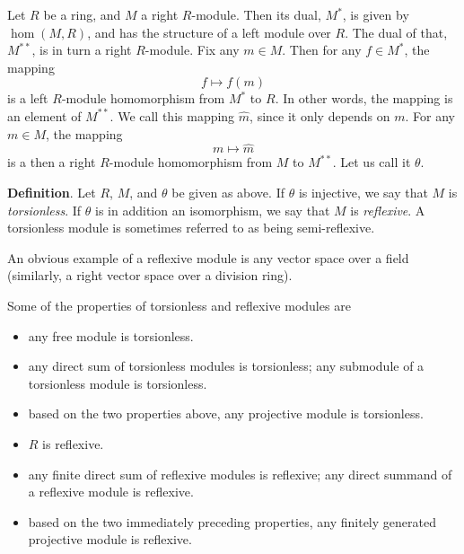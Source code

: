 \documentclass[12pt]{article}
\begin{document}
Let $R$ be a ring, and $M$ a right $R$-module.  Then its dual, $M^*$, is given by $\hom(M,R)$, and has the structure of a left module over $R$.  The dual of that, $M^{**}$, is in turn a right $R$-module.  Fix any $m\in M$.  Then for any $f\in M^*$, the mapping $$f \mapsto f(m)$$ is a left $R$-module homomorphism from $M^*$ to $R$.  In other words, the mapping is an element of $M^{**}$.  We call this mapping $\hat{m}$, since it only depends on $m$.  For any $m\in M$, the mapping $$m\mapsto \hat{m}$$ is a then a right $R$-module homomorphism from $M$ to $M^{**}$.  Let us call it $\theta$.

\textbf{Definition}.  Let $R$, $M$, and $\theta$ be given as above.  If $\theta$ is injective, we say that $M$ is \emph{torsionless}.  If $\theta$ is in addition an isomorphism, we say that $M$ is \emph{reflexive}.  A torsionless module is sometimes referred to as being semi-reflexive.

An obvious example of a reflexive module is any vector space over a field (similarly, a right vector space over a division ring).

Some of the properties of torsionless and reflexive modules are
\begin{itemize}
\item any free module is torsionless.
\item any direct sum of torsionless modules is torsionless; any submodule of a torsionless module is torsionless.
\item based on the two properties above, any projective module is torsionless.
\item $R$ is reflexive.
\item any finite direct sum of reflexive modules is reflexive; any direct summand of a reflexive module is reflexive.
\item based on the two immediately preceding properties, any finitely generated projective module is reflexive.
\end{itemize}

\end{document}
